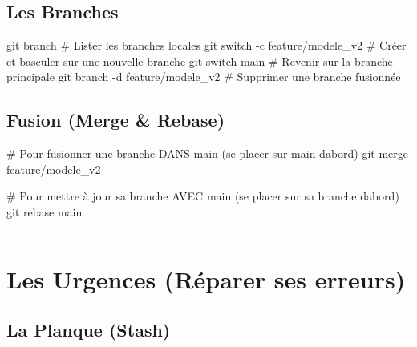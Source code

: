 \documentclass[
  letterpaper,
  DIV=11,
  numbers=noendperiod]{scrreprt}
\newenvironment{Shaded}{\begin{snugshade}}{\end{snugshade}}
\newcommand{\AttributeTok}[1]{\textcolor[rgb]{0.40,0.45,0.13}{#1}}
\newcommand{\CommentTok}[1]{\textcolor[rgb]{0.37,0.37,0.37}{#1}}
\newcommand{\FunctionTok}[1]{\textcolor[rgb]{0.28,0.35,0.67}{#1}}
\newcommand{\NormalTok}[1]{\textcolor[rgb]{0.00,0.23,0.31}{#1}}
\begin{document}
\subsection{Les Branches}\label{les-branches}

\begin{Shaded}
\begin{Highlighting}[]
\FunctionTok{git}\NormalTok{ branch                     }\CommentTok{\# Lister les branches locales}
\FunctionTok{git}\NormalTok{ switch }\AttributeTok{{-}c}\NormalTok{ feature/modele\_v2 }\CommentTok{\# Créer et basculer sur une nouvelle branche}
\FunctionTok{git}\NormalTok{ switch main                }\CommentTok{\# Revenir sur la branche principale}
\FunctionTok{git}\NormalTok{ branch }\AttributeTok{{-}d}\NormalTok{ feature/modele\_v2 }\CommentTok{\# Supprimer une branche fusionnée}
\end{Highlighting}
\end{Shaded}

\subsection{Fusion (Merge \& Rebase)}\label{fusion-merge-rebase}

\begin{Shaded}
\begin{Highlighting}[]
\CommentTok{\# Pour fusionner une branche DANS main (se placer sur main d\textquotesingle{}abord)}
\FunctionTok{git}\NormalTok{ merge feature/modele\_v2}

\CommentTok{\# Pour mettre à jour sa branche AVEC main (se placer sur sa branche d\textquotesingle{}abord)}
\FunctionTok{git}\NormalTok{ rebase main}
\end{Highlighting}
\end{Shaded}

\begin{center}\rule{0.5\linewidth}{0.5pt}\end{center}


\section{Les Urgences (Réparer ses
erreurs)}\label{les-urgences-ruxe9parer-ses-erreurs}

\subsection{La Planque (Stash)}\label{la-planque-stash}
\end{document}

